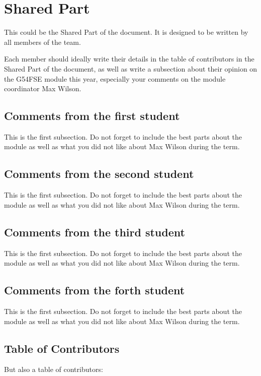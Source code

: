 \documentclass[../main/main.tex]{subfiles}
\begin{document}
\section{Shared Part}

This could be the Shared Part of the document. It is designed to be written by all members of the team.

Each member should ideally write their details in the table of contributors in the Shared Part of the document, as well as write a subsection about their opinion on the G54FSE module this year, especially your comments on the module coordinator Max Wilson.

\subsection{Comments from the first student}
This is the first subsection. Do not forget to include the best parts about the module as well as what you did not like about Max Wilson during the term.

\subsection{Comments from the second student}
This is the first subsection. Do not forget to include the best parts about the module as well as what you did not like about Max Wilson during the term.

\subsection{Comments from the third student}
This is the first subsection. Do not forget to include the best parts about the module as well as what you did not like about Max Wilson during the term.

\subsection{Comments from the forth student}
This is the first subsection. Do not forget to include the best parts about the module as well as what you did not like about Max Wilson during the term.

\subsection{Table of Contributors}
But also a table of contributors:
\end{document}
